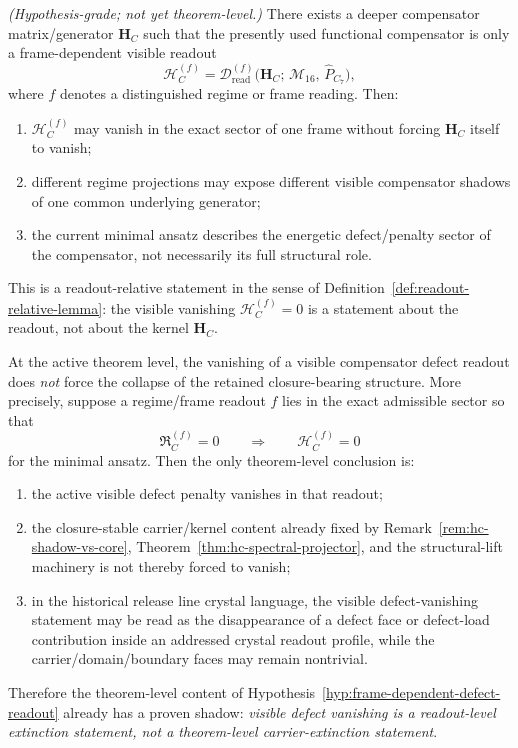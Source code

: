 \begin{proposition}
\label{hyp:frame-dependent-defect-readout}
\emph{(Hypothesis-grade; not yet theorem-level.)}
There exists a deeper compensator matrix/generator $\mathbf{H}_C$ such
that the presently used functional compensator is only a frame-dependent
visible readout
\[
 \mathcal{H}_C^{(f)}
 =
 \mathcal{D}_{\mathrm{read}}^{(f)}
 \bigl(\mathbf{H}_C;\,\mathcal{M}_{16},\,\hat P_{C_7}\bigr),
\]
where $f$ denotes a distinguished regime or frame reading. Then:
\begin{enumerate}[label=(\roman*)]
 \item $\mathcal{H}_C^{(f)}$ may vanish in the exact sector of one
 frame without forcing $\mathbf{H}_C$ itself to vanish;
 \item different regime projections may expose different visible
 compensator shadows of one common underlying generator;
 \item the current minimal ansatz describes the energetic defect/penalty
 sector of the compensator, not necessarily its full structural role.
\end{enumerate}
This is a readout-relative statement in the sense of
Definition~\ref{def:readout-relative-lemma}: the visible vanishing
$\mathcal{H}_C^{(f)} = 0$ is a statement about the readout, not about
the kernel $\mathbf{H}_C$.
\end{proposition}

\begin{theorem}
\label{thm:theorem-level-shadow-frame-dependent-defect-readout}
At the active theorem level, the vanishing of a visible compensator defect readout does \emph{not} force the collapse of the retained closure-bearing structure. More precisely, suppose a regime/frame readout $f$ lies in the exact admissible sector so that
\[
\mathfrak{R}_C^{(f)}=0
\qquad\Longrightarrow\qquad
\mathcal H_C^{(f)}=0
\]
for the minimal ansatz. Then the only theorem-level conclusion is:
\begin{enumerate}[leftmargin=2em,label=(\roman*)]
 \item the active visible defect penalty vanishes in that readout;
 \item the closure-stable carrier/kernel content already fixed by
 Remark~\ref{rem:hc-shadow-vs-core},
 Theorem~\ref{thm:hc-spectral-projector},
 and the structural-lift machinery is not thereby forced to vanish;
 \item in the historical release line crystal language, the visible defect-vanishing statement may be read as the disappearance of a defect face or defect-load contribution inside an addressed crystal readout profile, while the carrier/domain/boundary faces may remain nontrivial.
\end{enumerate}
Therefore the theorem-level content of Hypothesis~\ref{hyp:frame-dependent-defect-readout} already has a proven shadow: \emph{visible defect vanishing is a readout-level extinction statement, not a theorem-level carrier-extinction statement}.
\end{theorem}

